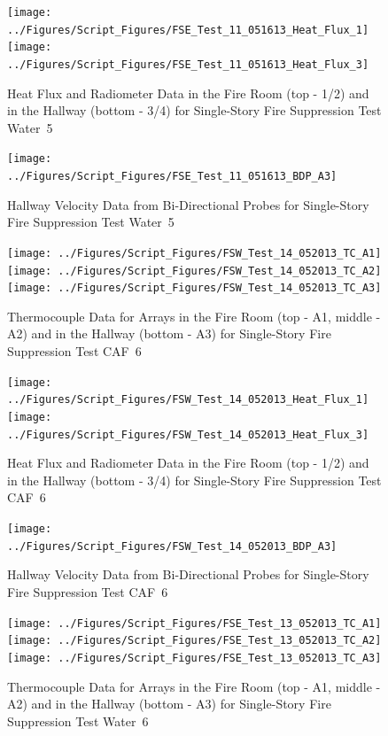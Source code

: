 \documentclass[12pt,oneside]{book}
\begin{document}
\begin{figure}[ht]
\texttt{[image: ../Figures/Script\_Figures/FSE\_Test\_11\_051613\_Heat\_Flux\_1]}
\texttt{[image: ../Figures/Script\_Figures/FSE\_Test\_11\_051613\_Heat\_Flux\_3]}
\caption{Heat Flux and Radiometer Data in the Fire Room (top - 1/2) and in the Hallway (bottom - 3/4) for Single-Story Fire Suppression Test Water~5}
\end{figure}

\begin{figure}[ht]
\texttt{[image: ../Figures/Script\_Figures/FSE\_Test\_11\_051613\_BDP\_A3]}
\caption{Hallway Velocity Data from Bi-Directional Probes for Single-Story Fire Suppression Test Water~5}
\end{figure}

\begin{figure}[ht]
\texttt{[image: ../Figures/Script\_Figures/FSW\_Test\_14\_052013\_TC\_A1]}
\texttt{[image: ../Figures/Script\_Figures/FSW\_Test\_14\_052013\_TC\_A2]}
\texttt{[image: ../Figures/Script\_Figures/FSW\_Test\_14\_052013\_TC\_A3]}
\caption{Thermocouple Data for Arrays in the Fire Room (top - A1, middle - A2) and in the Hallway (bottom - A3) for Single-Story Fire Suppression Test CAF~6}
\end{figure}

\begin{figure}[ht]
\texttt{[image: ../Figures/Script\_Figures/FSW\_Test\_14\_052013\_Heat\_Flux\_1]}
\texttt{[image: ../Figures/Script\_Figures/FSW\_Test\_14\_052013\_Heat\_Flux\_3]}
\caption{Heat Flux and Radiometer Data in the Fire Room (top - 1/2) and in the Hallway (bottom - 3/4) for Single-Story Fire Suppression Test CAF~6}
\end{figure}

\begin{figure}[ht]
\texttt{[image: ../Figures/Script\_Figures/FSW\_Test\_14\_052013\_BDP\_A3]}
\caption{Hallway Velocity Data from Bi-Directional Probes for Single-Story Fire Suppression Test CAF~6}
\end{figure}

\begin{figure}[ht]
\texttt{[image: ../Figures/Script\_Figures/FSE\_Test\_13\_052013\_TC\_A1]}
\texttt{[image: ../Figures/Script\_Figures/FSE\_Test\_13\_052013\_TC\_A2]}
\texttt{[image: ../Figures/Script\_Figures/FSE\_Test\_13\_052013\_TC\_A3]}
\caption{Thermocouple Data for Arrays in the Fire Room (top - A1, middle - A2) and in the Hallway (bottom - A3) for Single-Story Fire Suppression Test Water~6}
\end{figure}
\end{document}
